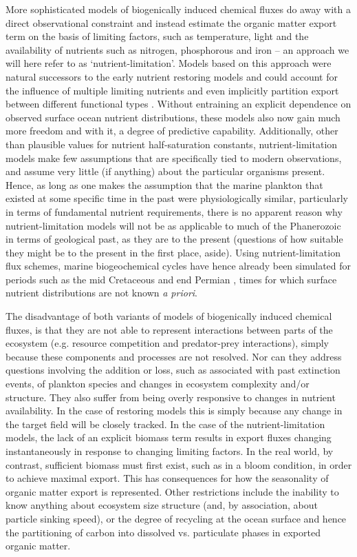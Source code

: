 \documentclass[gmd, manuscript]{copernicus}
\begin{document}
More sophisticated models of biogenically induced chemical fluxes do away with a direct observational constraint and instead estimate the organic matter export term on the basis of limiting factors, such as temperature, light and the availability of nutrients such as nitrogen, phosphorous and iron -- an approach we will here refer to as `nutrient-limitation'. Models based on this approach \citep[e.g.][]{Bacastow:1990, Heinze:1991, Archer:2000} were natural successors to the early nutrient restoring models and could account for the influence of multiple limiting nutrients and even implicitly partition export between different functional types \citep{Watson:2000}. Without entraining an explicit dependence on observed surface ocean nutrient distributions, these models also now gain much more freedom and with it, a degree of predictive capability. Additionally, other than plausible values for nutrient half-saturation constants, nutrient-limitation models make few assumptions that are specifically tied to modern observations, and assume very little (if anything) about the particular organisms present. Hence, as long as one makes the assumption that the marine plankton that existed at some specific time in the past were physiologically similar, particularly in terms of fundamental nutrient requirements, there is no apparent reason why nutrient-limitation models will not be as applicable to much of the Phanerozoic in terms of geological past, as they are to the present (questions of how suitable they might be to the present in the first place, aside). Using nutrient-limitation flux schemes, marine biogeochemical cycles have hence already been simulated for periods such as the mid Cretaceous \citep{Monteiro:2012} and end Permian \citep{Meyer:2008}, times for which surface nutrient distributions are not known \textit{a priori}.

The disadvantage of both  variants  of models of biogenically induced chemical fluxes, is that they are not able to represent interactions between parts of the ecosystem (e.g. resource competition and predator-prey interactions), simply because these components and processes are not resolved. Nor can they address questions involving the addition or loss, such as associated with past extinction events, of plankton species and changes in ecosystem complexity and/or structure. They also suffer from being overly responsive to changes in nutrient availability. In the case of restoring models this is simply because any change in the target field will be closely tracked. In the case of the nutrient-limitation models, the lack of an explicit biomass term results in export fluxes  changing instantaneously in response to changing limiting factors. In the real world, by contrast, sufficient biomass must first exist, such as in a bloom condition, in order to achieve maximal export. This has consequences for how the seasonality of organic matter  export  is represented. Other restrictions include the inability to know anything about ecosystem size structure (and, by association, about particle sinking speed), or the degree of recycling at the ocean surface and hence the partitioning of carbon into dissolved vs. particulate phases in exported organic matter. 
\end{document}
